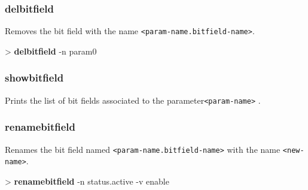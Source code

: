 \documentclass[10pt,a4paper]{article}
\begin{document}
{%
\subsubsection{delbitfield}
\label{subsec:delbitfield}

Removes the bit field with the name \texttt{<param-name.bitfield-name>}.\\


\begin{sampletitle}
> \textbf{\tool{} delbitfield} -n param0
\end{sampletitle}


\subsubsection{showbitfield}
\label{subsec:showbitfield}

Prints the list of bit fields associated to the parameter\texttt{<param-name>} .

\subsubsection{renamebitfield}
\label{subsec:renamebitfield}

Renames the bit field named \texttt{<param-name.bitfield-name>} with the name \texttt{<new-name>}.\\


\begin{sampletitle}
> \textbf{\tool{} renamebitfield} -n status.active -v enable
\end{sampletitle}

}
\end{document}
